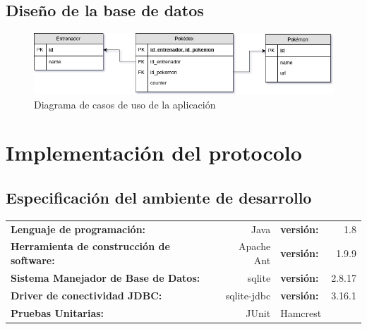 \documentclass[12pt]{article}
\begin{document}
\subsection{Diseño de la base de datos}
 \begin{figure}[H]
   \centering
   \includegraphics[width=1\textwidth]{PokeDB2}
   \caption{Diagrama de casos de uso de la aplicación}
 \end{figure}
\section{Implementación del protocolo}
\subsection{Especificación del ambiente de desarrollo}
\begin{tabular}{l r l r}
  \textbf{Lenguaje de programación:} & Java & \textbf{versión:} & 1.8 \\
  \textbf{Herramienta de construcción de software:} & Apache Ant & \textbf{versión:} & 1.9.9 \\
  \textbf{Sistema Manejador de Base de Datos:} & sqlite & \textbf{versión:} & 2.8.17 \\
  \textbf{Driver de conectividad JDBC:} & sqlite-jdbc & \textbf{versión:}& 3.16.1\\
  \textbf{Pruebas Unitarias:} & JUnit & Hamcrest \\
\end{tabular}

\newpage
\end{document}
